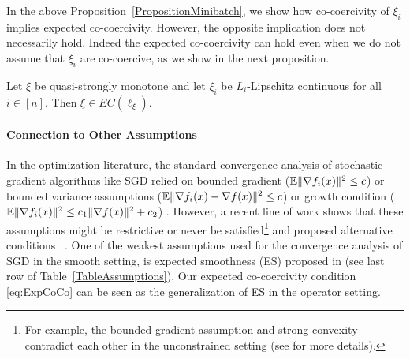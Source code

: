 \documentclass{article}
\begin{document}
\vspace{-2mm}
In the above Proposition~\ref{PropositionMinibatch}, we show how co-coercivity of $\xi_i$ implies expected co-coercivity. However, the opposite implication does not necessarily hold. Indeed the expected co-coercivity can hold even when we do not assume that $\xi_i$ are co-coercive, as we show in the next proposition.
\begin{proposition}
\label{PropositionExtra}
Let $\xi$ be quasi-strongly monotone and let $\xi_i$ be $L_i$-Lipschitz continuous for all $i \in [n]$. Then $\xi  \in EC(\ell_\xi)$.
\end{proposition}
\vspace{-2mm}
\paragraph{Connection to Other Assumptions}
In the optimization literature, the standard convergence analysis of stochastic gradient algorithms like SGD relied on bounded gradient ($\mathbb{E}\|\nabla f_i(x)\|^2 \leq c$) or bounded variance assumptions ($\mathbb{E}\|\nabla f_i(x)-\nabla f(x)\|^2 \leq c$) \citep{recht2011hogwild, hazan2014beyond, rakhlin2012making} or growth condition ($\mathbb{E}\|\nabla f_i(x)\|^2 \leq c_1 \|\nabla f(x)\|^2 +c_2$) \citep{bottou2018optimization, schmidt2017minimizing}. However, a recent line of work shows that these assumptions might be restrictive or never be satisfied\footnote{For example, the bounded gradient assumption and strong convexity contradict each other in the unconstrained setting (see \citep{pmlr-v80-nguyen18c} for more details).} and proposed alternative conditions~ \citep{pmlr-v80-nguyen18c, vaswani2018fast, gower2019sgd, gower2021sgd, khaled2020unified, khaled2020better, assran2018stochastic, koloskova2020unified,patel2021stochastic, loizou2020stochastic, loizou2020stochasticB}. One of the weakest assumptions used for the convergence analysis of SGD in the smooth setting, is expected smoothness (ES) proposed in \citet{gower2019sgd} (see last row of Table~\ref{TableAssumptions}). Our expected co-coercivity condition \eqref{eq:ExpCoCo} can be seen as the generalization of ES in the operator setting.
\end{document}
